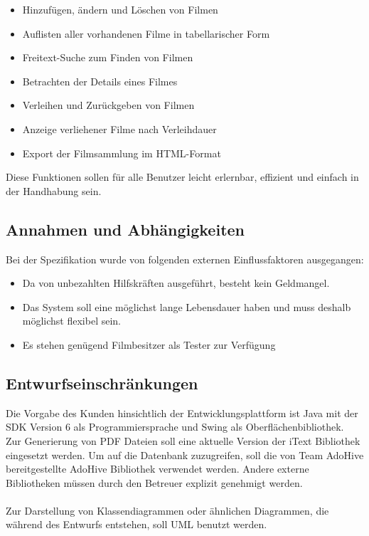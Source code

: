 \documentclass[oneside,german,oneside]{scrbook}
\begin{document}
        \begin{itemize}
          \item Hinzuf\"ugen, \"andern und L\"oschen von Filmen
          \item Auflisten aller vorhandenen Filme in tabellarischer Form
          \item Freitext-Suche zum Finden von Filmen
          \item Betrachten der Details eines Filmes
          \item Verleihen und Zur\"uckgeben von Filmen
          \item Anzeige verliehener Filme nach Verleihdauer
          \item Export der Filmsammlung im HTML-Format
        \end{itemize}

        Diese Funktionen sollen f\"ur alle Benutzer leicht erlernbar, effizient
        und einfach in der Handhabung sein.

    \subsection{Annahmen und Abh\"angigkeiten}\label{sec:Annahmen}

        Bei der Spezifikation wurde von folgenden externen Einflussfaktoren
        ausgegangen:

        \begin{itemize}
          \item Da von unbezahlten Hilfskr\"aften ausgef\"uhrt, besteht kein
          Geldmangel.
          \item Das System soll eine m\"oglichst lange Lebensdauer haben und muss
          deshalb m\"oglichst flexibel sein.
          \item Es stehen gen\"ugend Filmbesitzer als Tester zur Verf\"ugung
        \end{itemize}

    \subsection{Entwurfseinschr\"ankungen}\label{sec:Entwurfseinschraenkungen}

        Die Vorgabe des Kunden hinsichtlich der Entwicklungsplattform ist
        Java  mit der SDK Version 6 als Programmiersprache und Swing als 
        Oberflächenbibliothek. \\
        Zur Generierung von PDF Dateien soll eine aktuelle Version der
        iText Bibliothek eingesetzt werden. Um auf die Datenbank 
        zuzugreifen, soll die von Team AdoHive bereitgestellte AdoHive 
        Bibliothek verwendet werden. Andere externe Bibliotheken
        müssen durch den Betreuer explizit genehmigt werden.\\ \\
        Zur Darstellung von Klassendiagrammen oder ähnlichen Diagrammen,
        die während des Entwurfs entstehen, soll UML benutzt werden.
\end{document}
